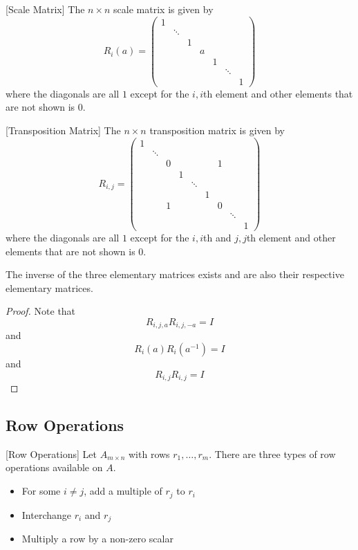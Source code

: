 \documentclass[a4paper]{article}
\begin{document}
\begin{defn}{}{}[Scale Matrix] The $n\times n$ scale matrix is given by $$R_{i}(a)=
\begin{pmatrix}
1&&&&&&\\
&\ddots&&&&&\\
&&1&&&&\\
&&&a&&&\\
&&&&1&&\\
&&&&&\ddots&\\
&&&&&&1
\end{pmatrix}$$ where the diagonals are all $1$ except for the $i,i$th element and other elements that are not shown is $0$.
\end{defn}

\begin{defn}{}{}[Transposition Matrix] The $n\times n$ transposition matrix is given by $$R_{i,j}=
\begin{pmatrix}
1&&&&&&&&\\
&\ddots&&&&&&&\\
&&0&&&&1&&\\
&&&1&&&&&\\
&&&&\ddots&&&&\\
&&&&&1&&&\\
&&1&&&&0&&\\
&&&&&&&\ddots&\\
&&&&&&&&1
\end{pmatrix}$$ where the diagonals are all $1$ except for the $i,i$th and $j,j$th element and other elements that are not shown is $0$.
\end{defn}

\begin{thm}{}{} The inverse of the three elementary matrices exists and are also their respective elementary matrices. 
\end{thm}
\begin{proof} Note that $$R_{i,j,a}R_{i,j,-a}=I$$ and $$R_i(a)R_i(a^{-1})=I$$ and $$R_{i,j}R_{i,j}=I$$
\end{proof}

\subsection{Row Operations}
\begin{defn}{}{}[Row Operations] Let $A_{m\times n}$ with rows $r_1,\dots,r_m$. There are three types of row operations available on $A$. 
\begin{itemize}
\item For some $i\neq j$, add a multiple of $r_j$ to $r_i$
\item Interchange $r_i$ and $r_j$
\item Multiply a row by a non-zero scalar
\end{itemize}
\end{defn}
\end{document}
